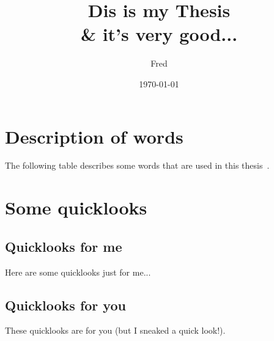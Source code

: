 \documentclass{fsthesis}
\begin{document}
\title{Dis is my Thesis\\ \& it's very good...}
\author{Fred}            %
\date{\today}%
\maketitle

\tableofcontents
\typeout{****}
\typeout{****}


%



\appendix
\chapter{Description of words}
The following table describes some words that are used in this thesis~\cite{RN327}.

\chapter{Some quicklooks}
\section{Quicklooks for me}
Here are some quicklooks just for me...

\section{Quicklooks for you}
These quicklooks are for you (but I sneaked a quick look!).



\end{document}
